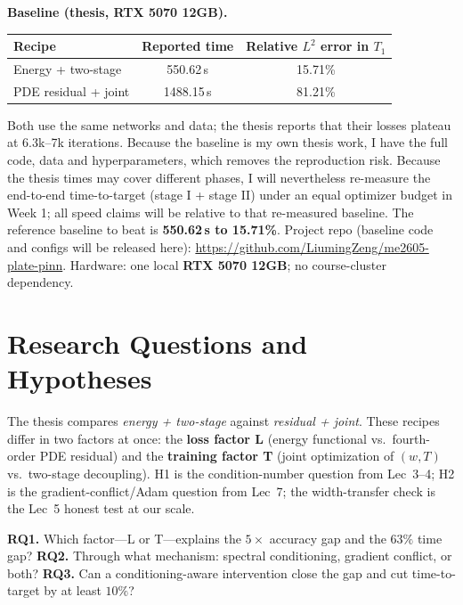 \documentclass[10pt]{article}
\begin{document}
\textbf{Baseline (thesis, RTX 5070 12GB).}
\begin{center}
\vspace{-4pt}
\begin{tabular}{lcc}
\toprule
Recipe & Reported time & Relative $L^2$ error in $T_1$ \\
\midrule
Energy + two-stage & 550.62\,s & 15.71\% \\
PDE residual + joint & 1488.15\,s & 81.21\% \\
\bottomrule
\end{tabular}
\vspace{-2pt}
\end{center}
Both use the same networks and data; the thesis reports that their losses plateau at 6.3k--7k iterations. Because the baseline is my own thesis work, I have the full code, data and hyperparameters, which removes the reproduction risk. Because the thesis times may cover different phases, I will nevertheless re-measure the end-to-end time-to-target (stage I + stage II) under an equal optimizer budget in Week 1; all speed claims will be relative to that re-measured baseline. The reference baseline to beat is \textbf{550.62\,s to 15.71\%}. Project repo (baseline code and configs will be released here): \url{https://github.com/LiumingZeng/me2605-plate-pinn}. Hardware: one local \textbf{RTX 5070 12GB}; no course-cluster dependency.

\section{Research Questions and Hypotheses}

The thesis compares \emph{energy + two-stage} against \emph{residual + joint}. These recipes differ in two factors at once: the \textbf{loss factor L} (energy functional vs.\ fourth-order PDE residual) and the \textbf{training factor T} (joint optimization of $(w,T)$ vs.\ two-stage decoupling). H1 is the condition-number question from Lec~3--4; H2 is the gradient-conflict/Adam question from Lec~7; the width-transfer check is the Lec~5 honest test at our scale.

\textbf{RQ1.} Which factor---L or T---explains the $5\times$ accuracy gap and the $63\%$ time gap? \textbf{RQ2.} Through what mechanism: spectral conditioning, gradient conflict, or both? \textbf{RQ3.} Can a conditioning-aware intervention close the gap and cut time-to-target by at least $10\%$?
\end{document}
